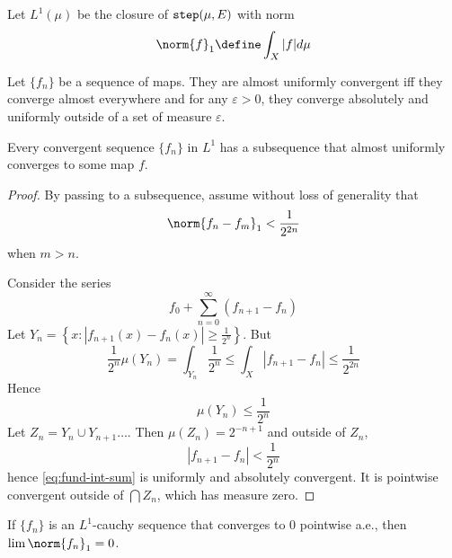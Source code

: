 \documentclass{scrartcl}
\begin{document}
\begin{defn}[$L^1(\mu)$]
  Let $L^1(\mu)$ be the closure of $\mathtt{step}(\mu,E)$ with norm 
  \[
  \norm{f}_1\define \int_X |f|d\mu
  \]
\end{defn}

\begin{defn}
  Let $\{f_n\}$ be a sequence of maps. They are almost uniformly convergent iff they converge almost everywhere and for any $\varepsilon>0$, they converge absolutely and uniformly outside of a set of measure $\varepsilon$. 
\end{defn}

\begin{theorem}
  \label{th:fund-int}
  Every convergent sequence $\{f_n\}$ in $L^1$ has a subsequence that almost uniformly converges to some map $f$. 
\end{theorem}
\begin{proof}
  By passing to a subsequence, assume without loss of generality that
  \[
  \norm{f_n - f_m}_1< \frac 1 {2^{2n}}
  \]
  when $m>n$. 
  
  Consider the series
  \begin{equation}
  f_0 + \sum_{n=0}^\infty (f_{n+1}-f_n)
  \label{eq:fund-int-sum}
  \end{equation}
  Let $Y_n=\left\{x:|f_{n+1}(x)-f_n(x)| \geq \frac 1 {2^n}\right\}$.
  But
  \[
  \frac{1}{2^n} \mu(Y_n)=\int_{Y_n} \frac 1 {2^n} \leq \int_X |f_{n+1}-f_n| \leq \frac 1 {2^{2n}}
  \]
  Hence \[\mu(Y_n)\leq \frac 1 {2^n}\]
  Let $Z_n=Y_n\cup Y_{n+1}\dots$. Then $\mu(Z_n)=2^{-n+1}$ and outside of $Z_n$,
  \[
  |f_{n+1}-f_n|<\frac 1 {2^n}
  \]
  hence \cref{eq:fund-int-sum} is uniformly and absolutely convergent. It is pointwise convergent outside of $ \bigcap Z_n $, which has measure zero.  
\end{proof}
\begin{theorem}
  If $\{f_n\}$ is an $L^1$-cauchy sequence that converges to $0$ pointwise a.e., then $\lim \norm {f_n}_1=0$. 
\end{theorem}
\end{document}

